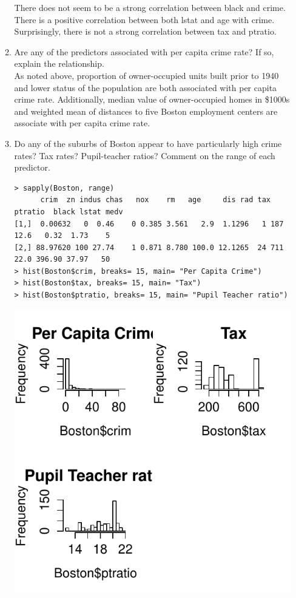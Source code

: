 \documentclass[11pt]{article}
\begin{document}
\begin{enumerate}
\begin{enumerate}
There does not seem to be a strong correlation between black and crime.  There is a positive correlation between both lstat and age with crime.  Surprisingly, there is not a strong correlation between tax and ptratio.
\item Are any of the predictors associated with per capita crime rate?  If so, explain the relationship.\\
As noted above, proportion of owner-occupied units built prior to 1940 and lower status of the population are both associated with per capita crime rate.  Additionally, median value of owner-occupied homes in \$1000s and weighted mean of distances to five Boston employment centers are associate with per capita crime rate.
\item Do any of the suburbs of Boston appear to have particularly high crime rates? Tax rates? Pupil-teacher ratios? Comment on the range of each predictor.
\begin{lstlisting}
> sapply(Boston, range)
      crim  zn indus chas   nox    rm   age     dis rad tax ptratio  black lstat medv
[1,]  0.00632   0  0.46    0 0.385 3.561   2.9  1.1296   1 187    12.6   0.32  1.73    5
[2,] 88.97620 100 27.74    1 0.871 8.780 100.0 12.1265  24 711    22.0 396.90 37.97   50
> hist(Boston$crim, breaks= 15, main= "Per Capita Crime")
> hist(Boston$tax, breaks= 15, main= "Tax")
> hist(Boston$ptratio, breaks= 15, main= "Pupil Teacher ratio")
\end{lstlisting}
\begin{center}
\includegraphics[scale=1.25]{plot10.pdf}
\end{center}


\end{enumerate}
\end{enumerate}
\end{document}
